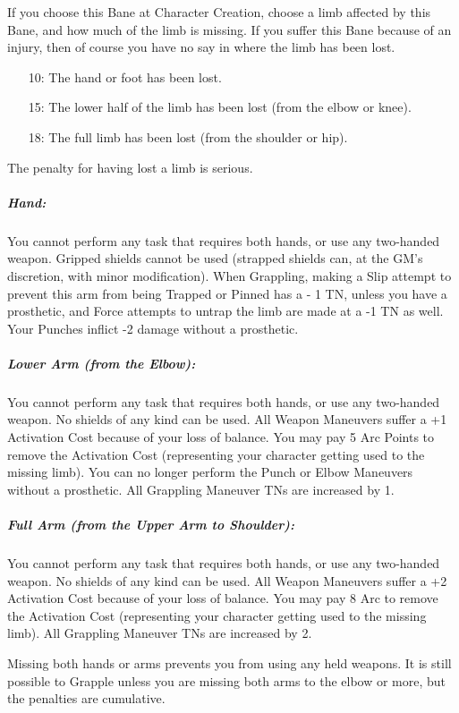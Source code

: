\documentclass[oneside,11pt,english]{book}
\begin{document}
If you choose this Bane at Character Creation, choose a limb affected by this Bane, and how much of the limb is missing. If you suffer this Bane because of an injury, then of course you have no say in where the limb has been lost.
\begin{itemize}
\item [10:] The hand or foot has been lost.
\item [15:] The lower half of the limb has been lost (from the elbow or knee).
\item [18:] The full limb has been lost (from the shoulder or hip).
\end{itemize}
The penalty for having lost a limb is serious.
\vspace*{-10pt}\subparagraph*{Hand:}
You cannot perform any task that requires both hands, or use any two-handed weapon. Gripped 
shields cannot be used (strapped shields can, at the GM’s discretion, with minor modification). 
When Grappling, making a Slip attempt to prevent this arm from being Trapped or Pinned has a -
1 TN, unless you have a prosthetic, and Force attempts to untrap the limb are made at a -1 TN as 
well. Your Punches inflict -2 damage without a prosthetic. 
\vspace*{-10pt}\subparagraph*{Lower Arm (from the Elbow):}
You cannot perform any task that requires both hands, or use any two-handed weapon. No shields 
of any kind can be used. All Weapon Maneuvers suffer a +1 Activation Cost because of your loss 
of balance. You may pay 5 Arc Points to remove the Activation Cost (representing your character 
getting used to the missing limb). You can no longer perform the Punch or Elbow Maneuvers 
without a prosthetic. All Grappling Maneuver TNs are increased by 1. 
\vspace*{-10pt}\subparagraph*{Full Arm (from the Upper Arm to Shoulder):}
You cannot perform any task that requires both hands, or use any two-handed weapon. No shields 
of any kind can be used. All Weapon Maneuvers suffer a +2 Activation Cost because of your loss 
of balance. You may pay 8 Arc to remove the Activation Cost (representing your character 
getting used to the missing limb). All Grappling Maneuver TNs are increased by 2. 

Missing both hands or arms prevents you from using any held weapons. It is still possible to 
Grapple unless you are missing both arms to the elbow or more, but the penalties are cumulative. 
\end{document}
